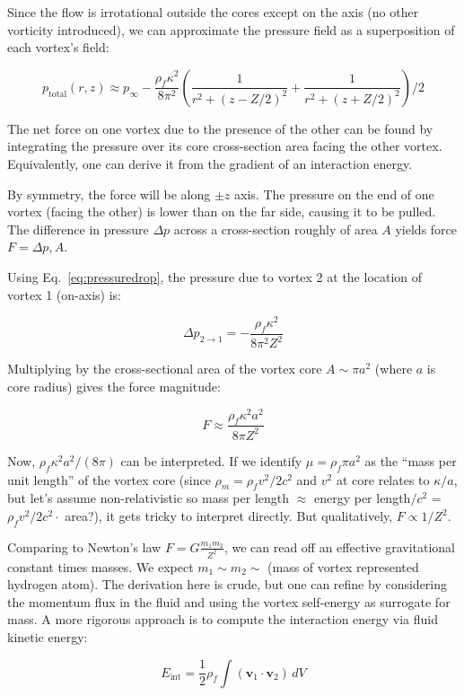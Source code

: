 \documentclass[10pt,reprint,aps,onecolumn,nofootinbib]{revtex4-2}
\newcommand{\rhoF}{\rho_{\!f}}     %
\newcommand{\rhoM}{\rho_{\!m}}     %
\begin{document}
Since the flow is irrotational outside the cores except on the axis (no other vorticity introduced), we can approximate the pressure field as a superposition of each vortex’s field:


\[
p_{\text{total}}(r,z) \approx p_{\infty} - \frac{\rhoF \kappa^2}{8\pi^2} \left( \frac{1}{r^2 + (z - Z/2)^2} + \frac{1}{r^2 + (z + Z/2)^2} \right) / 2
\]


The net force on one vortex due to the presence of the other can be found by integrating the pressure over its core cross-section area facing the other vortex. Equivalently, one can derive it from the gradient of an interaction energy.


By symmetry, the force will be along $\pm z$ axis. The pressure on the end of one vortex (facing the other) is lower than on the far side, causing it to be pulled. The difference in pressure $\Delta p$ across a cross-section roughly of area $A$ yields force $F = \Delta p , A$.


Using Eq.~\eqref{eq:pressuredrop}, the pressure due to vortex 2 at the location of vortex 1 (on-axis) is:


\[
\Delta p_{2\to1} = -\frac{\rhoF \kappa^2}{8\pi^2 Z^2}
\]


Multiplying by the cross-sectional area of the vortex core $A \sim \pi a^2$ (where $a$ is core radius) gives the force magnitude:

\begin{equation}
F \approx \frac{\rhoF \kappa^2 a^2}{8\pi Z^2}
\label{eq:forceest}
\end{equation}

Now, $\rhoF \kappa^2 a^2/(8\pi)$ can be interpreted. If we identify $\mu = \rhoF \pi a^2$ as the “mass per unit length” of the vortex core (since $\rhoM = \rhoF v^2/2c^2$ and $v^2$ at core relates to $\kappa/a$, but let’s assume non-relativistic so mass per length $\approx$ energy per length$/c^2$ = $\rhoF v^2/2c^2 \cdot$ area?), it gets tricky to interpret directly. But qualitatively, $F \propto 1/Z^2$.


Comparing to Newton’s law $F = G \frac{m_1 m_2}{Z^2}$, we can read off an effective gravitational constant times masses. We expect $m_1 \sim m_2 \sim$ (mass of vortex represented hydrogen atom). The derivation here is crude, but one can refine by considering the momentum flux in the fluid and using the vortex self-energy as surrogate for mass. A more rigorous approach is to compute the interaction energy via fluid kinetic energy:


\[
E_{\text{int}} = \frac{1}{2}\rhoF \int (\mathbf{v}_1 \cdot \mathbf{v}_2)\, dV
\]
\end{document}
